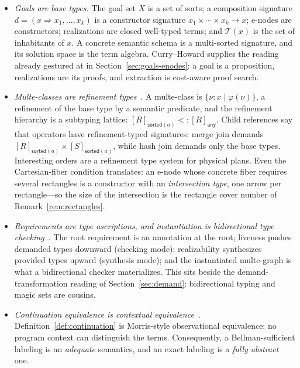 \documentclass[sigconf,nonacm]{acmart}
\theoremstyle{definition}
\theoremstyle{plain}
\theoremstyle{remark}
\begin{document}
\begin{itemize}

\item
\emph{Goals are base types.}  The goal set \(X\) is a set of sorts;
a composition signature \(d=(x\Rightarrow x_1,\ldots,x_k)\) is a
constructor signature \(x_1\times\cdots\times x_k\to x\); e-nodes
are constructors; realizations are closed well-typed terms; and
\(\mathcal T(x)\) is the set of inhabitants of \(x\).  A concrete
semantic schema is a multi-sorted signature, and its solution space
is the term algebra.  Curry--Howard supplies the reading already
gestured at in Section~\ref{sec:goals-enodes}: a goal is a
proposition, realizations are its proofs, and extraction is
cost-aware proof search.

\item
\emph{Multe-classes are refinement
types}~\cite{freeman1991refinement}.  A multe-class is
\(\{\nu:x\mid\varphi(\nu)\}\), a refinement of the base type by a
semantic predicate, and the refinement hierarchy is a subtyping
lattice: \([R]_{\mathsf{sorted}(a)}<:[R]_{\mathsf{any}}\).  Child
references say that operators have refinement-typed signatures:
merge join demands
\([R]_{\mathsf{sorted}(a)}\times[S]_{\mathsf{sorted}(a)}\), while
hash join demands only the base types.  Interesting orders are a
refinement type system for physical plans.  Even the Cartesian-fiber
condition translates: an e-node whose concrete fiber requires
several rectangles is a constructor with an \emph{intersection
type}, one arrow per rectangle---so the size of the intersection is
the rectangle cover number of Remark~\ref{rem:rectangles}.

\item
\emph{Requirements are type ascriptions, and instantiation is
bidirectional type checking}~\cite{dunfield2021bidirectional}.  The
root requirement is an annotation at the root; liveness pushes
demanded types downward (checking mode); realizability synthesizes
provided types upward (synthesis mode); and the instantiated
multe-graph is what a bidirectional checker materializes.  This sits
beside the demand-transformation reading of
Section~\ref{sec:demand}: bidirectional typing and magic sets are
cousins.

\item
\emph{Continuation equivalence is contextual
equivalence}~\cite{morris1969}.
Definition~\ref{def:continuation} is Morris-style observational
equivalence: no program context can distinguish the terms.
Consequently, a Bellman-sufficient labeling is an \emph{adequate}
semantics, and an exact labeling is a \emph{fully abstract} one.

\end{itemize}
\end{document}

